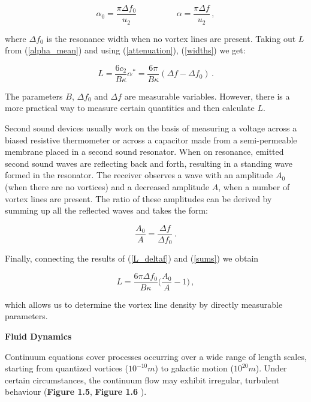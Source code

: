 \begin{equation}
\alpha_0 = \frac{\pi \Delta f_0}{u_2}
\hspace{2cm}
\alpha = \frac{\pi \Delta f}{u_2}\,,
\label{widths}
\end{equation}

where $\Delta f_0$ is the resonance width when no vortex lines are present. Taking out $L$ from (\ref{alpha_mean}) and using (\ref{attenuation}), (\ref{widths}) we get:

\begin{equation}
L
= \frac{6 c_2}{B \kappa} \alpha^*
= \frac{6\pi}{B\kappa} (\Delta f - \Delta f_0)\,.
\label{L_deltaf}
\end{equation}

The parameters $B$, $\Delta f_0$ and $\Delta f$ are measurable variables. However, there is a more practical way to measure certain quantities and then calculate $L$.

Second sound devices usually work on the basis of measuring a voltage across a biased resistive thermometer or across a capacitor made from a semi-permeable membrane placed in a second sound resonator. When on resonance, emitted second sound waves are reflecting back and forth, resulting in a standing wave formed in the resonator. The receiver observes a wave with an amplitude $A_0$ (when there are no vortices) and a decreased amplitude $A$, when a number of vortex lines are present.  The ratio of these amplitudes can be derived by summing up all the reflected waves and takes the form\cite{physrevB}:

\begin{equation}
\frac{A_0}{A}
= \frac{\Delta f}{\Delta f_0}\,.
\label{sums}
\end{equation}

Finally, connecting the results of (\ref{L_deltaf}) and (\ref{sums}) we obtain

\begin{equation}
L = \frac{6\pi \Delta f_0}{B\kappa}\bigg( \frac{A_0}{A} - 1 \bigg)\,,
\label{L}
\end{equation}

which allows us to determine the vortex line density by directly measurable parameters.

\newpage

{\Huge \bfseries Fluid Dynamics}
\vspace{1cm}

Continuum equations cover processes occurring over a wide range of length scales, starting from quantized vortices ($10^{-10}\unit{m}$) to galactic motion ($10^{20}\unit{m}$). Under certain circumstances, the continuum flow may exhibit irregular, turbulent behaviour ({\sffamily\textbf{Figure 1.5}}, {\sffamily\textbf{Figure 1.6}} \cite{turbulence}).


